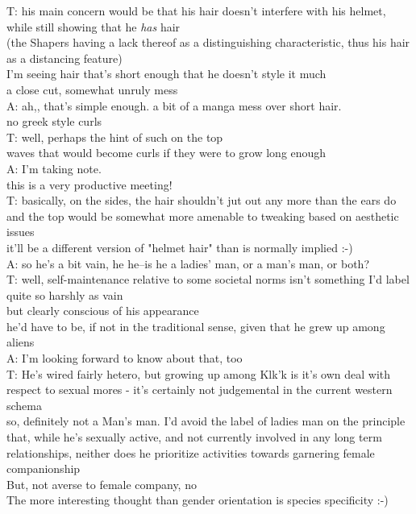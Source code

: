 T: his main concern would be that his hair doesn't interfere with his helmet, while still showing that he {\em has} hair\\
(the Shapers having a lack thereof as a distinguishing characteristic, thus his hair as a distancing feature)\\
I'm seeing hair that's short enough that he doesn't style it much\\
a close cut, somewhat unruly mess\\
A: ah,, that's simple enough. a bit of a manga mess over short hair.\\
no greek style curls\\
T: well, perhaps the hint of such on the top\\
waves that would become curls if they were to grow long enough\\
A: I'm taking note.\\
this is a very productive meeting!\\
T: basically, on the sides, the hair shouldn't jut out any more than the ears do\\
and the top would be somewhat more amenable to tweaking based on aesthetic issues\\
it'll be a different version of "helmet hair" than is normally implied :-)\\
A: so he's a bit vain, he he--is he a ladies' man, or a man's man, or both?\\
T: well, self-maintenance relative to some societal norms isn't something I'd label quite so harshly as vain\\
but clearly conscious of his appearance\\
he'd have to be, if not in the traditional sense, given that he grew up among aliens\\
A: I'm looking forward to know about that, too\\
T: He's wired fairly hetero, but growing up among Klk'k is it's own deal with respect to sexual mores - it's certainly not judgemental in the current western schema\\
so, definitely not a Man's man. I'd avoid the label of ladies man on the principle that, while he's sexually active, and not currently involved in any long term relationships, neither does he prioritize activities towards garnering female companionship\\
But, not averse to female company, no\\
The more interesting thought than gender orientation is species specificity :-)\\
